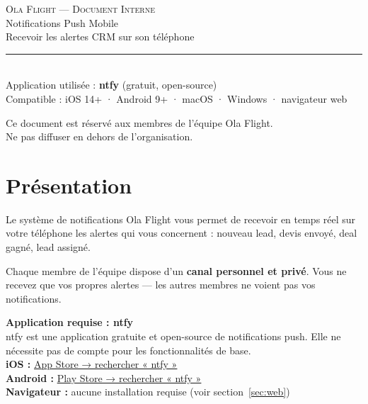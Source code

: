 \documentclass[a4paper, 11pt]{article}
\begin{document}

\thispagestyle{empty}
\vspace*{3cm}

\begin{center}
  {\fontsize{9}{11}\selectfont\color{olaGold}\textsc{Ola Flight — Document Interne}}\\[1.2em]
  {\fontsize{28}{33}\selectfont\color{olaBlack} Notifications Push Mobile}\\[0.6em]
  {\fontsize{14}{18}\selectfont\color{olaGrey} Recevoir les alertes CRM sur son téléphone}\\[3em]
  \textcolor{olaLight}{\rule{8cm}{0.5pt}}\\[2.5em]
  {\small\color{olaGrey}
    Application utilisée : \textbf{ntfy} (gratuit, open-source)\\[0.3em]
    Compatible : iOS 14+ · Android 9+ · macOS · Windows · navigateur web
  }
\end{center}

\vfill
{\small\color{olaGrey}\centering
  Ce document est réservé aux membres de l'équipe Ola Flight.\\
  Ne pas diffuser en dehors de l'organisation.
\par}

\newpage
\setcounter{page}{1}

\section{Présentation}

Le système de notifications Ola Flight vous permet de recevoir en temps réel
sur votre téléphone les alertes qui vous concernent : nouveau lead, devis envoyé,
deal gagné, lead assigné.

\medskip
Chaque membre de l'équipe dispose d'un \textbf{canal personnel et privé}.
Vous ne recevez que vos propres alertes — les autres membres ne voient pas vos notifications.

\begin{infobox}
\textbf{Application requise : ntfy}\\[0.4em]
ntfy est une application gratuite et open-source de notifications push.
Elle ne nécessite pas de compte pour les fonctionnalités de base.\\[0.5em]
\textbf{iOS :} \href{https://apps.apple.com/app/ntfy/id1625396347}{App Store → rechercher « ntfy »}\\
\textbf{Android :} \href{https://play.google.com/store/apps/details?id=io.heckel.ntfy}{Play Store → rechercher « ntfy »}\\
\textbf{Navigateur :} aucune installation requise (voir section~\ref{sec:web})
\end{infobox}
\end{document}
